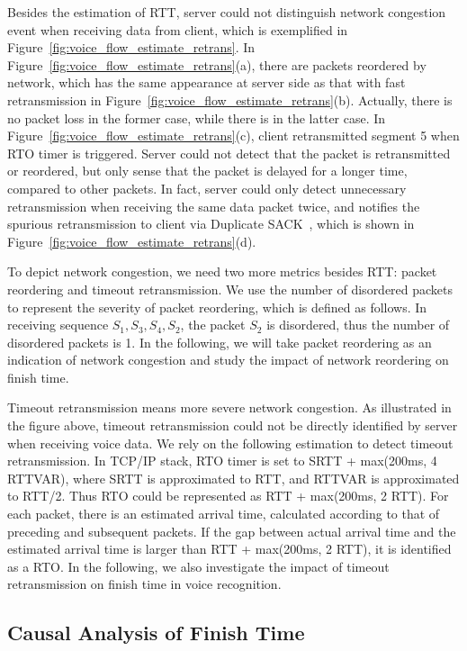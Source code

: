 Besides the estimation of RTT, server could not distinguish network congestion event when receiving data from client, which is exemplified in Figure~\ref{fig:voice_flow_estimate_retrans}. In Figure~\ref{fig:voice_flow_estimate_retrans}(a), there are packets reordered by network, which has the same appearance at server side as that with fast retransmission in Figure~\ref{fig:voice_flow_estimate_retrans}(b). Actually, there is no packet loss in the former case, while there is in the latter case. In Figure~\ref{fig:voice_flow_estimate_retrans}(c), client retransmitted segment 5 when RTO timer is triggered. Server could not detect that the packet is retransmitted or reordered, but only sense that the packet is delayed for a longer time, compared to other packets. In fact, server could only detect unnecessary retransmission when receiving the same data packet twice, and notifies the spurious retransmission to client via Duplicate SACK~\cite{rfc3078}, which is shown in Figure~\ref{fig:voice_flow_estimate_retrans}(d).

To depict network congestion, we need two more metrics besides RTT: packet reordering and timeout retransmission. We use the number of disordered packets to represent the severity of packet reordering, which is defined as follows. In receiving sequence $S_1, S_3, S_4, S_2$, the packet $S_2$ is disordered, thus the number of disordered packets is 1. In the following, we will take packet reordering as an indication of network congestion and study the impact of network reordering on finish time.

Timeout retransmission means more severe network congestion. As illustrated in the figure above, timeout retransmission could not be directly identified by server when receiving voice data. We rely on the following estimation to detect timeout retransmission. In TCP/IP stack, RTO timer is set to SRTT + max(200ms, 4 RTTVAR)\cite{rfc62982011computing}, where SRTT is approximated to RTT, and RTTVAR is approximated to RTT/2. Thus RTO could be represented as RTT + max(200ms, 2 RTT). For each packet, there is an estimated arrival time, calculated according to that of preceding and subsequent packets. If the gap between actual arrival time and the estimated arrival time is larger than RTT + max(200ms, 2 RTT), it is identified as a RTO. In the following, we also investigate the impact of timeout retransmission on finish time in voice recognition.

\subsection{Causal Analysis of Finish Time}

